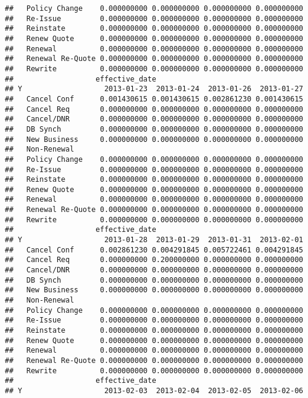 \documentclass[]{article}
\begin{document}
\begin{verbatim}
##   Policy Change    0.000000000 0.000000000 0.000000000 0.000000000
##   Re-Issue         0.000000000 0.000000000 0.000000000 0.000000000
##   Reinstate        0.000000000 0.000000000 0.000000000 0.000000000
##   Renew Quote      0.000000000 0.000000000 0.000000000 0.000000000
##   Renewal          0.000000000 0.000000000 0.000000000 0.000000000
##   Renewal Re-Quote 0.000000000 0.000000000 0.000000000 0.000000000
##   Rewrite          0.000000000 0.000000000 0.000000000 0.000000000
##                   effective_date
## Y                   2013-01-23  2013-01-24  2013-01-26  2013-01-27
##   Cancel Conf      0.001430615 0.001430615 0.002861230 0.001430615
##   Cancel Req       0.000000000 0.000000000 0.000000000 0.000000000
##   Cancel/DNR       0.000000000 0.000000000 0.000000000 0.000000000
##   DB Synch         0.000000000 0.000000000 0.000000000 0.000000000
##   New Business     0.000000000 0.000000000 0.000000000 0.000000000
##   Non-Renewal                                                     
##   Policy Change    0.000000000 0.000000000 0.000000000 0.000000000
##   Re-Issue         0.000000000 0.000000000 0.000000000 0.000000000
##   Reinstate        0.000000000 0.000000000 0.000000000 0.000000000
##   Renew Quote      0.000000000 0.000000000 0.000000000 0.000000000
##   Renewal          0.000000000 0.000000000 0.000000000 0.000000000
##   Renewal Re-Quote 0.000000000 0.000000000 0.000000000 0.000000000
##   Rewrite          0.000000000 0.000000000 0.000000000 0.000000000
##                   effective_date
## Y                   2013-01-28  2013-01-29  2013-01-31  2013-02-01
##   Cancel Conf      0.002861230 0.004291845 0.005722461 0.004291845
##   Cancel Req       0.000000000 0.200000000 0.000000000 0.000000000
##   Cancel/DNR       0.000000000 0.000000000 0.000000000 0.000000000
##   DB Synch         0.000000000 0.000000000 0.000000000 0.000000000
##   New Business     0.000000000 0.000000000 0.000000000 0.000000000
##   Non-Renewal                                                     
##   Policy Change    0.000000000 0.000000000 0.000000000 0.000000000
##   Re-Issue         0.000000000 0.000000000 0.000000000 0.000000000
##   Reinstate        0.000000000 0.000000000 0.000000000 0.000000000
##   Renew Quote      0.000000000 0.000000000 0.000000000 0.000000000
##   Renewal          0.000000000 0.000000000 0.000000000 0.000000000
##   Renewal Re-Quote 0.000000000 0.000000000 0.000000000 0.000000000
##   Rewrite          0.000000000 0.000000000 0.000000000 0.000000000
##                   effective_date
## Y                   2013-02-03  2013-02-04  2013-02-05  2013-02-06

\end{verbatim}
\end{document}

